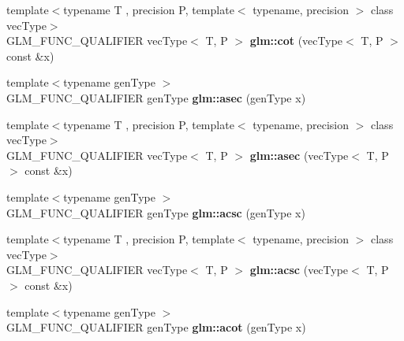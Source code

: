 \begin{DoxyCompactItemize}
\item 
\hypertarget{namespaceglm_a77c21bbfc00f4c06152bec335e01842b}{{\footnotesize template$<$typename T , precision P, template$<$ typename, precision $>$ class vec\-Type$>$ }\\G\-L\-M\-\_\-\-F\-U\-N\-C\-\_\-\-Q\-U\-A\-L\-I\-F\-I\-E\-R vec\-Type$<$ T, P $>$ {\bfseries glm\-::cot} (vec\-Type$<$ T, P $>$ const \&x)}\label{namespaceglm_a77c21bbfc00f4c06152bec335e01842b}

\item 
\hypertarget{namespaceglm_a315e5fee4f9d52147c9507993d404c0b}{{\footnotesize template$<$typename gen\-Type $>$ }\\G\-L\-M\-\_\-\-F\-U\-N\-C\-\_\-\-Q\-U\-A\-L\-I\-F\-I\-E\-R gen\-Type {\bfseries glm\-::asec} (gen\-Type x)}\label{namespaceglm_a315e5fee4f9d52147c9507993d404c0b}

\item 
\hypertarget{namespaceglm_ad7641a007eb14df8822245d8e13c90bb}{{\footnotesize template$<$typename T , precision P, template$<$ typename, precision $>$ class vec\-Type$>$ }\\G\-L\-M\-\_\-\-F\-U\-N\-C\-\_\-\-Q\-U\-A\-L\-I\-F\-I\-E\-R vec\-Type$<$ T, P $>$ {\bfseries glm\-::asec} (vec\-Type$<$ T, P $>$ const \&x)}\label{namespaceglm_ad7641a007eb14df8822245d8e13c90bb}

\item 
\hypertarget{namespaceglm_a321f32c7c632a6aa72f038269b763f64}{{\footnotesize template$<$typename gen\-Type $>$ }\\G\-L\-M\-\_\-\-F\-U\-N\-C\-\_\-\-Q\-U\-A\-L\-I\-F\-I\-E\-R gen\-Type {\bfseries glm\-::acsc} (gen\-Type x)}\label{namespaceglm_a321f32c7c632a6aa72f038269b763f64}

\item 
\hypertarget{namespaceglm_a2e31d118da987ebe04ad6ca3c366b8d8}{{\footnotesize template$<$typename T , precision P, template$<$ typename, precision $>$ class vec\-Type$>$ }\\G\-L\-M\-\_\-\-F\-U\-N\-C\-\_\-\-Q\-U\-A\-L\-I\-F\-I\-E\-R vec\-Type$<$ T, P $>$ {\bfseries glm\-::acsc} (vec\-Type$<$ T, P $>$ const \&x)}\label{namespaceglm_a2e31d118da987ebe04ad6ca3c366b8d8}

\item 
\hypertarget{namespaceglm_add36fe1afa6b5889b971ebc569f1579d}{{\footnotesize template$<$typename gen\-Type $>$ }\\G\-L\-M\-\_\-\-F\-U\-N\-C\-\_\-\-Q\-U\-A\-L\-I\-F\-I\-E\-R gen\-Type {\bfseries glm\-::acot} (gen\-Type x)}\label{namespaceglm_add36fe1afa6b5889b971ebc569f1579d}


\end{DoxyCompactItemize}
